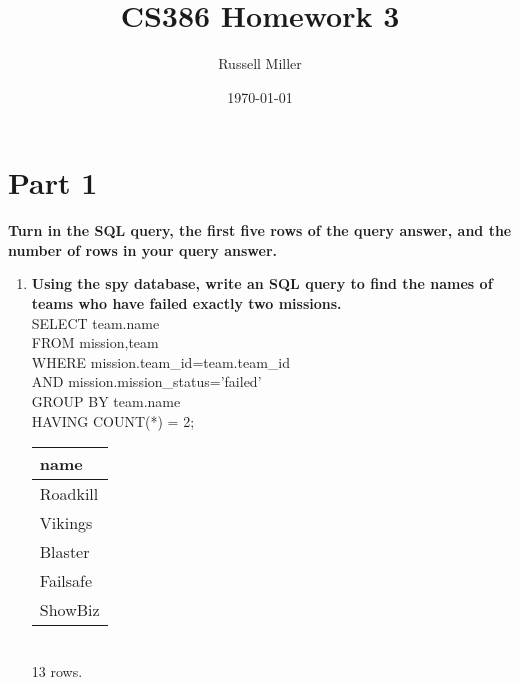 \documentclass{article}
\title{CS386 Homework 3}
\author{Russell Miller}
\date{\today}
\begin{document}
\maketitle

\section*{Part 1}
\textbf{Turn in the SQL query, the first five rows of the query answer, and the number of rows
in your query answer.}
\begin{enumerate}

\item
\textbf{Using the spy database, write an SQL query to find the names of teams who have failed
exactly two missions.\\}
SELECT team.name\\
FROM mission,team\\
WHERE mission.team\_id=team.team\_id\\
AND mission.mission\_status='failed'\\
GROUP BY team.name\\
HAVING COUNT(*) = 2;\\
\begin{tabular}{l}
 name      \\
\hline
 Roadkill\\
 Vikings\\
 Blaster\\
 Failsafe\\
 ShowBiz\\
\end{tabular}
\\13 rows.\\


\end{enumerate}
\end{document}
